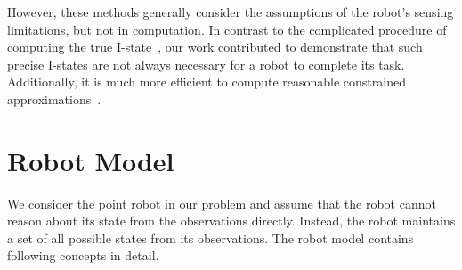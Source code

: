 However, these methods generally consider the assumptions of the robot's sensing limitations, 
but not in computation. 
%
In contrast to the complicated procedure of computing the true I-state~\cite{TovLav08, YuLav10}, 
our work contributed to demonstrate that such precise I-states are not always necessary for a robot to complete its task.
Additionally, it is much more efficient to compute reasonable constrained approximations~\cite{SonOka12}.

\section{Robot Model}
\label{sec:robot-mod}
We consider the point robot in our problem and assume that the robot cannot reason about
its state from the observations directly. 
%
Instead, the robot maintains a set of all possible states from its observations. 
%
The robot model contains following concepts in detail.
